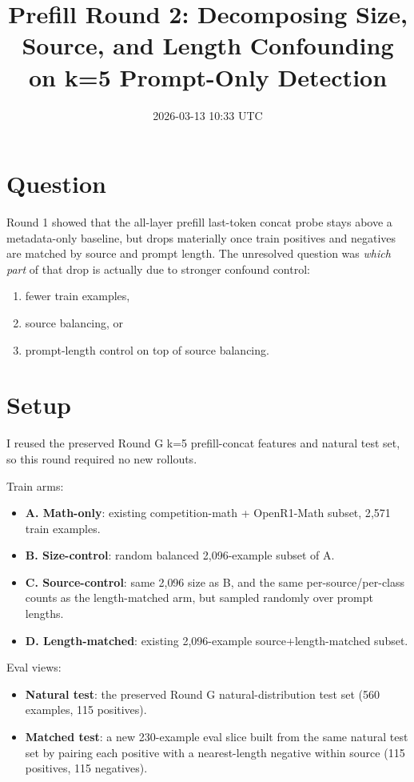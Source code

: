 \documentclass[11pt]{article}
\title{Prefill Round 2: Decomposing Size, Source, and Length Confounding on k=5 Prompt-Only Detection}
\author{}
\date{2026-03-13 10:33 UTC}
\begin{document}
\maketitle

\section*{Question}
Round 1 showed that the all-layer prefill last-token concat probe stays above a metadata-only baseline, but drops materially once train positives and negatives are matched by source and prompt length. The unresolved question was \emph{which part} of that drop is actually due to stronger confound control:
\begin{enumerate}
  \item fewer train examples,
  \item source balancing, or
  \item prompt-length control on top of source balancing.
\end{enumerate}

\section*{Setup}
I reused the preserved Round G k=5 prefill-concat features and natural test set, so this round required no new rollouts.

Train arms:
\begin{itemize}
  \item \textbf{A. Math-only}: existing competition-math + OpenR1-Math subset, 2{,}571 train examples.
  \item \textbf{B. Size-control}: random balanced 2{,}096-example subset of A.
  \item \textbf{C. Source-control}: same 2{,}096 size as B, and the same per-source/per-class counts as the length-matched arm, but sampled randomly over prompt lengths.
  \item \textbf{D. Length-matched}: existing 2{,}096-example source+length-matched subset.
\end{itemize}

Eval views:
\begin{itemize}
  \item \textbf{Natural test}: the preserved Round G natural-distribution test set (560 examples, 115 positives).
  \item \textbf{Matched test}: a new 230-example eval slice built from the same natural test set by pairing each positive with a nearest-length negative within source (115 positives, 115 negatives).
\end{itemize}
\end{document}
